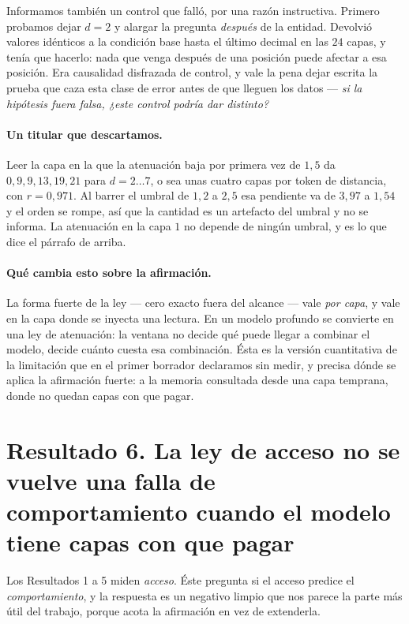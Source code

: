 \documentclass[11pt,a4paper]{article}
\begin{document}
Informamos también un control que falló, por una razón instructiva. Primero probamos dejar $d{=}2$ y
alargar la pregunta \emph{después} de la entidad. Devolvió valores idénticos a la condición base hasta
el último decimal en las $24$ capas, y tenía que hacerlo: nada que venga después de una posición puede
afectar a esa posición. Era causalidad disfrazada de control, y vale la pena dejar escrita la prueba
que caza esta clase de error antes de que lleguen los datos --- \emph{si la hipótesis fuera falsa,
¿este control podría dar distinto?}

\paragraph{Un titular que descartamos.} Leer la capa en la que la atenuación baja por primera vez de
$1{,}5$ da $0, 9, 9, 13, 19, 21$ para $d = 2 \ldots 7$, o sea unas cuatro capas por token de
distancia, con $r = 0{,}971$. Al barrer el umbral de $1{,}2$ a $2{,}5$ esa pendiente va de $3{,}97$ a
$1{,}54$ y el orden se rompe, así que la cantidad es un artefacto del umbral y no se informa. La
atenuación en la capa $1$ no depende de ningún umbral, y es lo que dice el párrafo de arriba.

\paragraph{Qué cambia esto sobre la afirmación.} La forma fuerte de la ley --- cero exacto fuera del
alcance --- vale \emph{por capa}, y vale en la capa donde se inyecta una lectura. En un modelo
profundo se convierte en una ley de atenuación: la ventana no decide qué puede llegar a combinar el
modelo, decide cuánto cuesta esa combinación. Ésta es la versión cuantitativa de la limitación que en
el primer borrador declaramos sin medir, y precisa dónde se aplica la afirmación fuerte: a la memoria
consultada desde una capa temprana, donde no quedan capas con que pagar.

\section{Resultado 6. La ley de acceso no se vuelve una falla de comportamiento cuando el modelo tiene capas con que pagar}

Los Resultados 1 a 5 miden \emph{acceso}. Éste pregunta si el acceso predice el \emph{comportamiento},
y la respuesta es un negativo limpio que nos parece la parte más útil del trabajo, porque acota la
afirmación en vez de extenderla.
\end{document}
